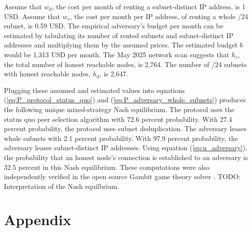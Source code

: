 \documentclass[english]{mrl}
\theoremstyle{plain}
\begin{document}
Assume that $w_{d}$, the cost per month of renting a subnet-distinct
IP address, is 1 USD. Assume that $w_{s}$, the cost per month per
IP address, of renting a whole /24 subnet, is 0.59 USD. The empirical
adversary's budget per month can be estimated by tabulating its number
of rented subnets and subnet-distinct IP addresses and multiplying
them by the assumed prices. The estimated budget $b$ would be 1,313
USD per month. The May 2025 network scan suggests that $h_{s}$, the
total number of honest reachable nodes, is 2,764. The number of /24
subnets with honest reachable nodes, $h_{d}$, is 2,647.

Plugging these assumed and estimated values into equations (\ref{eq:P_protocol_status_quo})
and (\ref{eq:P_adversary_whole_subnets}) produces the following unique
mixed-strategy Nash equilibrium. The protocol uses the status quo
peer selection algorithm with 72.6 percent probability. With 27.4
percent probability, the protocol uses subnet deduplication. The adversary
leases whole subnets with 2.1 percent probability. With 97.9 percent
probability, the adversary leases subnet-distinct IP addresses. Using
equation (\ref{eq:u_adversary}), the probability that an honest node's
connection is established to an adversary is 32.5 percent in this
Nash equilibrium. These computations were also independently verified
in the open source Gambit game theory solver \cite{Gambit2025}. TODO:
Interpretation of the Nash equilbrium.

\begin{singlespace}


\end{singlespace}

\appendix

\section{Appendix\label{sec:appendix}}
\end{document}
